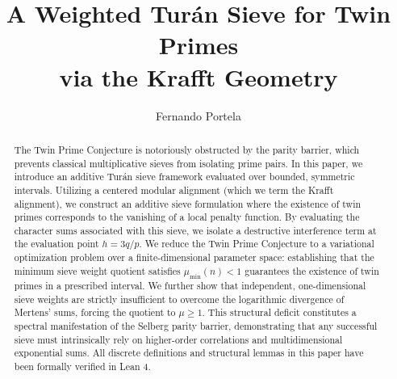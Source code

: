 \documentclass{ws-ijnt}
\def\catchline#1#2#3#4#5{}
\begin{document}

\catchline{}{}{}{}{}

\title{A Weighted Turán Sieve for Twin Primes\\via the Krafft Geometry}

\author{Fernando Portela}

\address{Research Scholar\\
 }

\maketitle

\begin{history}
\end{history}

\begin{abstract}
The Twin Prime Conjecture is notoriously obstructed by the parity barrier, which prevents classical
multiplicative sieves from isolating prime pairs. In this paper, we introduce an additive
Turán sieve framework evaluated over bounded, symmetric intervals. Utilizing a centered modular
alignment (which we term the Krafft alignment), we construct an additive sieve formulation where the
existence of twin primes corresponds to the vanishing of a local penalty function. By evaluating the
character sums associated with this sieve, we isolate a destructive interference term at the
evaluation point $h = 3q/p$. We reduce the Twin Prime Conjecture to a variational optimization
problem over a finite-dimensional parameter space: establishing that the minimum sieve weight
quotient satisfies $\mu_{\min}(n) < 1$ guarantees the existence of twin primes in a prescribed
interval. We further show that independent, one-dimensional sieve weights are strictly insufficient
to overcome the logarithmic divergence of Mertens' sums, forcing the quotient to $\mu \ge 1$. This
structural deficit constitutes a spectral manifestation of the Selberg parity barrier, demonstrating
that any successful sieve must intrinsically rely on higher-order correlations and multidimensional
exponential sums. All discrete definitions and structural lemmas in this paper have been formally
verified in Lean 4.
\end{abstract}
\end{document}
